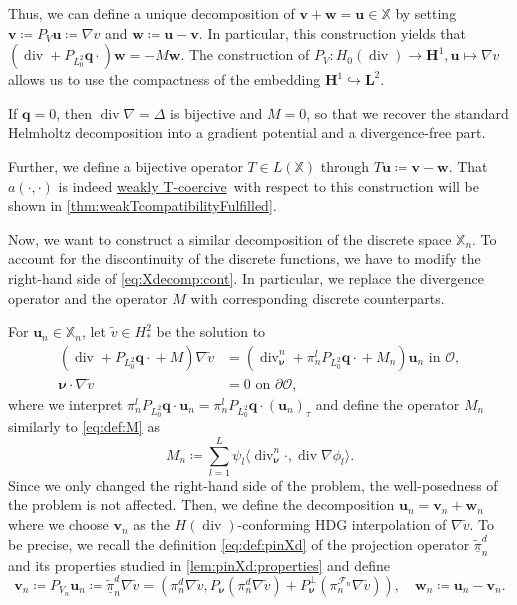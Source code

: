 \documentclass{m2an}
\newcommand{\inner}[1]{\langle #1 \rangle}
\newcommand{\dom}{\mathcal{O}} %
\newcommand{\nv}{\boldsymbol{\nu}}
\renewcommand{\u}{\mathbf{u}}
\renewcommand{\v}{\mathbf{v}}
\newcommand{\w}{\mathbf{w}}
\newcommand{\q}{\mathbf{q}} %
\renewcommand{\div}{\operatorname{div}}
\newcommand{\X}{\mathbb{X}}
\newcommand{\Xn}{\mathbb{X}_n}
\newcommand{\bH}{{\mathbf H}}
\newcommand{\bL}{\mathbf{L}}
\newcommand{\ddiv}{\div_{\nv}^n}
\newcommand{\Fn}{\mathcal{F}_n}
\newcommand{\divPqM}{( \div + P_{L^2_0} \q \cdot \! + M )}
\newcommand{\divPq}{( \div + P_{L^2_0} \q \cdot )}
\newcommand{\ddivpqMn}{(\ddiv + \pi_n^l P_{L^2_0} \q \cdot \! + M_n)}
\newcommand{\PVol}[1]{(#1)_{\tau}}
\newcommand{\pinXd}{\underline{\tilde{\pi}}_n^d}
\newcommand{\weaklyTcoercive}{\hyperlink{weakTcoercivity}{weakly T-coercive}}
\theoremstyle{plain}
\theoremstyle{definition}
\begin{document}
Thus, we can define a unique decomposition of $\v + \w = \u \in \X$ by setting $\v \coloneqq P_{V} \u \coloneqq \nabla v$ and $\w \coloneqq \u - \v$. In particular, this construction yields that $\divPq \w = -M \w$. The construction of $P_V : H_0(\div) \to \bH^1, \u \mapsto \nabla v$ allows us to use the compactness of the embedding $\bH^1 \hookrightarrow \bL^2$. 

If $\q = 0$, then $\div \nabla = \Delta$ is bijective and $M = 0$, so that we recover the standard Helmholtz decomposition into a gradient potential and a divergence-free part. 


Further, we define a bijective operator $T \in L(\X)$ through $T \u \coloneqq \v - \w$. That $a(\cdot,\cdot)$ is indeed \weaklyTcoercive~with respect to this construction will be shown in \cref{thm:weakTcompatibilityFulfilled}. 

Now, we want to construct a similar decomposition of the discrete space $\Xn$. To account for the discontinuity of the discrete functions, we have to modify the right-hand side of \eqref{eq:Xdecomp:cont}. In particular, we replace the divergence operator and the operator $M$ with corresponding discrete counterparts.

For $\u_n \in \Xn$, let $\tilde{v} \in H^2_\ast$ be the solution to 
\begin{equation}\label{eq:Xdecomp:discr}
   \begin{aligned}
	   \divPqM \nabla \tilde{v} &= \ddivpqMn \u_n  \text{ in } \dom,\\  
      \nv \cdot \nabla \tilde{v} &= 0 \text{ on } \partial \dom,
   \end{aligned}
\end{equation}
where we interpret $\pi_n^l P_{L^2_0} \q \cdot \u_n = \pi_n^l P_{L^2_0} \q \cdot \PVol{\u_n}$ and define the operator $M_n$ similarly to \eqref{eq:def:M} as
\begin{equation}
   M_n \coloneqq \sum_{l = 1}^L \psi_{l} \inner{\ddiv \cdot, \div \nabla \phi_{l}}.
\end{equation}
Since we only changed the right-hand side of the problem, the well-posedness of the problem is not affected.
Then, we define the decomposition $\u_n = \v_n + \w_n$ where we choose $\v_n$ as the $H(\div)$-conforming HDG interpolation of $\nabla \tilde{v}$. To be precise, we recall the definition \eqref{eq:def:pinXd} of the projection operator $\pinXd$ and its properties studied in \cref{lem:pinXd:properties} and define  
\begin{equation}
   \v_n \coloneqq P_{V_n} \u_n \coloneqq \pinXd \nabla \tilde{v} = (\pi_n^d \nabla \tilde{v}, P_{\nv}(\pi_n^d \nabla \tilde{v}) + P_{\nv}^{\perp}(\pi_n^{\Fn}\nabla \tilde{v})), \quad \w_n \coloneqq \u_n - \v_n. 
\end{equation}
\end{document}
